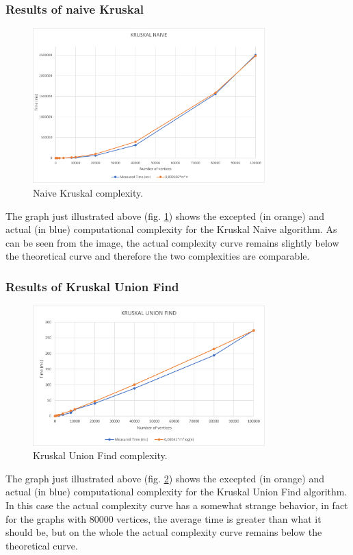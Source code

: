 \subsubsection{Results of naive Kruskal}
\begin{figure}[H]
    \centering
    \includegraphics[width=0.8\textwidth]{../img/KruskalNaive.png}
    \caption{Naive Kruskal complexity.}
    \label{fig:kruskal}
\end{figure}
The graph just illustrated above (fig. \ref{fig:kruskal}) shows the excepted (in orange) and actual 
(in blue) computational complexity for the Kruskal Naive algorithm. As can be seen from the image, 
the actual complexity curve remains slightly below the theoretical curve and therefore the two complexities are comparable.

\subsubsection{Results of Kruskal Union Find}
\begin{figure}[H]
    \centering
    \includegraphics[width=0.8\textwidth]{../img/KruskalUnionFind.png}
    \caption{Kruskal Union Find complexity.}
    \label{fig:kruskaluf}
\end{figure}
The graph just illustrated above (fig. \ref{fig:kruskaluf}) shows the excepted (in orange) and actual 
(in blue) computational complexity for the Kruskal Union Find algorithm. In this case the actual complexity 
curve has a somewhat strange behavior, in fact for the graphs with 80000 vertices, the average time is greater than 
what it should be, but on the whole the actual complexity curve remains below the theoretical curve.

